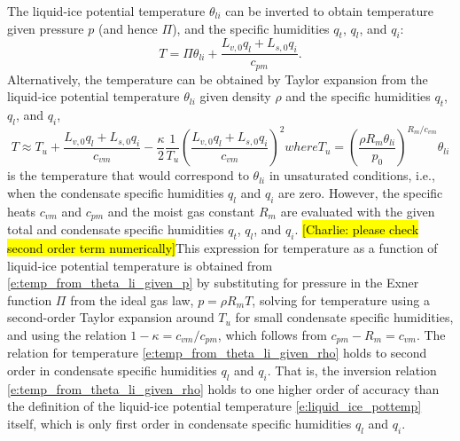 \documentclass{report}
\begin{document}
The liquid-ice potential temperature $\theta_{li}$ can be inverted to obtain temperature given pressure $p$ (and hence $\Pi$), and the specific humidities $q_t$, $q_l$, and $q_i$:
\begin{equation}\label{e:temp_from_theta_li_given_p}
    T = \Pi \theta_{li} + \frac{L_{v, 0} q_l + L_{s, 0} q_i}{c_{pm}}.
\end{equation}
Alternatively, the temperature can be obtained by Taylor expansion from the liquid-ice potential temperature $\theta_{li}$ given density $\rho$ and the specific humidities $q_t$, $q_l$, and $q_i$,
\begin{subequations}\label{e:temp_from_theta_li_given_rho}
\begin{equation}
T \approx T_u + \frac{L_{v,0} q_l + L_{s,0}q_i}{c_{vm}} - \frac{\kappa}{2} \frac{1}{T_u}\left(\frac{L_{v,0} q_l + L_{s,0} q_i}{c_{vm}}\right)^2
\end{equation}
where 
\begin{equation}
   T_u =  \left( \frac{\rho R_m \theta_{li}}{p_0} \right)^{R_m/c_{vm}} \theta_{li}
\end{equation}
\end{subequations}
is the temperature that would correspond to $\theta_{li}$ in unsaturated conditions, i.e., when the condensate specific humidities $q_l$ and $q_i$ are zero. However, the specific heats $c_{vm}$ and $c_{pm}$ and the moist gas constant $R_m$ are evaluated with the given total and condensate specific humidities $q_t$, $q_l$, and $q_i$.
\hl{[Charlie: please check second order term numerically]}This expression for temperature as a function of liquid-ice potential temperature is obtained from \eqref{e:temp_from_theta_li_given_p} by substituting for pressure in the Exner function $\Pi$ from the ideal gas law, $p=\rho R_m T$, solving for temperature using a second-order Taylor expansion around $T_u$ for small condensate specific humidities, and using the relation $1-\kappa = c_{vm}/c_{pm}$, which follows from $c_{pm} - R_m = c_{vm}$. The relation for temperature \eqref{e:temp_from_theta_li_given_rho} holds to second order in condensate specific humidities $q_l$ and $q_i$. That is, the inversion relation \eqref{e:temp_from_theta_li_given_rho} holds to one higher order of accuracy than the definition of the liquid-ice potential temperature \eqref{e:liquid_ice_pottemp} itself, which is only first order in condensate specific humidities $q_l$ and $q_i$.
\end{document}
